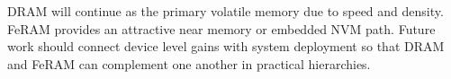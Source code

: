 DRAM will continue as the primary volatile memory due to speed and density. FeRAM provides an attractive near memory or embedded NVM path. Future work should connect device level gains with system deployment so that DRAM and FeRAM can complement one another in practical hierarchies.
